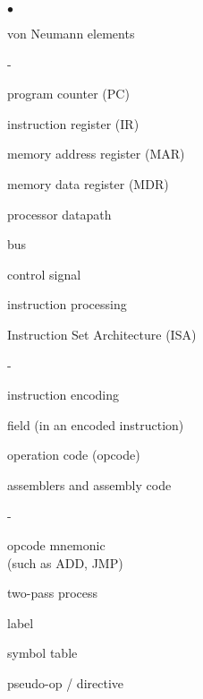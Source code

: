 \begin{minipage}[t]{2.6in}
\begin{list}{$\bullet$}{\setlength{\itemsep}{0pt}\setlength{\parskip}{0pt}%
\setlength{\topsep}{0pt}\setlength{\partopsep}{0pt}\setlength{\parsep}{0pt}}

\item{von Neumann elements}
\begin{list}{-}{\setlength{\itemsep}{0pt}\setlength{\parskip}{0pt}%
\setlength{\topsep}{0pt}\setlength{\partopsep}{0pt}\setlength{\parsep}{0pt}}
\item{program counter (PC)}
\item{instruction register (IR)}
\item{memory address register (MAR)}
\item{memory data register (MDR)}
\item{processor datapath}
\item{bus}
\item{control signal}
\item{instruction processing}
\end{list}

\item{Instruction Set Architecture (ISA)}
\begin{list}{-}{\setlength{\itemsep}{0pt}\setlength{\parskip}{0pt}%
\setlength{\topsep}{0pt}\setlength{\partopsep}{0pt}\setlength{\parsep}{0pt}}
\item{instruction encoding}
\item{field (in an encoded instruction)}
\item{operation code (opcode)}
\end{list}

\item{assemblers and assembly code}
\begin{list}{-}{\setlength{\itemsep}{0pt}\setlength{\parskip}{0pt}%
\setlength{\topsep}{0pt}\setlength{\partopsep}{0pt}\setlength{\parsep}{0pt}}
\item{opcode mnemonic\\ (such as ADD, JMP)}
\item{two-pass process}
\item{label}
\item{symbol table}
\item{pseudo-op / directive}
\end{list}

\end{list}
\end{minipage}\hspace{.75in}

